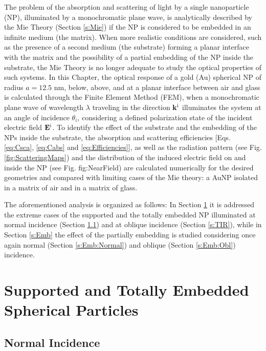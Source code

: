 \documentclass[11pt]{Latex/Classes/PhDthesisPSnPDF}
\begin{document}
    The problem of the absorption and scattering of light by a single nanoparticle (NP), illuminated by a monochromatic plane wave, is analytically described by the Mie Theory (Section \ref{s:Mie}) if the NP is considered to be embedded in an infinite medium (the matrix). When more realistic conditions are considered, such as the presence of a second medium (the substrate) forming a planar interface with the matrix and the possibility of a partial embedding of the NP inside the substrate, the Mie Theory is no longer adequate to study the optical properties of such systems. In this Chapter, the optical response of a gold (Au) spherical NP of radius $a = 12.5$ nm, below, above, and at a planar interface between air and glass is calculated through the Finite Element Method (FEM), when a monochromatic plane wave of wavelength $\lambda$ traveling in the direction $\vb{k}^\text{i}$ illuminates the system at an angle of incidence $\theta_i$, considering a defined polarization state of the incident electric field $\vb{E}^\text{i}$. To identify the effect of the substrate and the embedding of the NPs inside the substrate, the absorption and scattering  efficiencies [Eqs. \eqref{eq:Csca}, \eqref{eq:Cabs} and \eqref{eq:Efficiencies}], as well as the radiation pattern (see Fig. \ref{fig:ScatteringMaps}) and the distribution of the induced electric field on and inside the NP (see Fig. {fig:NearField}) are calculated numerically for the desired geometries and compared with limiting cases of the Mie theory: a AuNP isolated in a matrix of air and in a matrix of glass.

    The aforementioned analysis is organized as follows: In Section \ref{s:Totally} it is addressed the extreme cases of the supported and the totally embedded NP illuminated at normal incidence (Section \ref{s:Totally:Normal}) and at oblique incidence (Section \ref{s:TIR}), while in Section \ref{s:Emb} the effect of the partially embedding is studied considering once again  normal (Section \ref{s:Emb:Normal}) and oblique (Section \ref{s:Emb:Obl}) incidence.

    \section{Supported and Totally Embedded Spherical Particles}
     \label{s:Totally}
        

        \subsection{Normal Incidence}
        
         \label{s:Totally:Normal}
         
\end{document}
